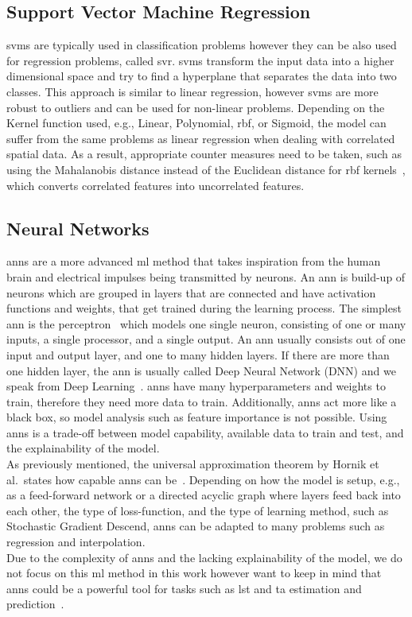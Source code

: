 \subsection{Support Vector Machine Regression}

\gls{svm}s are typically used in classification problems however they can be also used for regression problems, called \gls{svr}. \gls{svm}s transform the input data into a higher dimensional space and try to find a hyperplane that separates the data into two classes. This approach is similar to linear regression, however \gls{svm}s are more robust to outliers and can be used for non-linear problems. Depending on the Kernel function used, e.g., Linear, Polynomial, \gls{rbf}, or Sigmoid, the model can suffer from the same problems as linear regression when dealing with correlated spatial data.
As a result, appropriate counter measures need to be taken, such as using the Mahalanobis distance instead of the Euclidean distance for \gls{rbf} kernels~\cite{kamada2006support}, which converts correlated features into uncorrelated features.

\subsection{Neural Networks}

\gls{ann}s are a more advanced \gls{ml} method that takes inspiration from the human brain and electrical impulses being transmitted by neurons. An \gls{ann} is build-up of neurons which are grouped in layers that are connected and have activation functions and weights, that get trained during the learning process. The simplest \gls{ann} is the perceptron~\cite{rosenblatt1957perceptron} which models one single neuron, consisting of one or many inputs, a single processor, and a single output. An \gls{ann} usually consists out of one input and output layer, and one to many hidden layers. If there are more than one hidden layer, the \gls{ann} is usually called Deep Neural Network (DNN) and we speak from Deep Learning~\cite{lecun2015deep}. \gls{ann}s have many hyperparameters and weights to train, therefore they need more data to train. Additionally, \gls{ann}s act more like a black box, so model analysis such as feature importance is not possible. Using \gls{ann}s is a trade-off between model capability, available data to train and test, and the explainability of the model.\\
As previously mentioned, the universal approximation theorem by Hornik et al.\ states how capable \gls{ann}s can be~\cite{hornik1989multilayer}. Depending on how the model is setup, e.g., as a feed-forward network or a directed acyclic graph where layers feed back into each other, the type of loss-function, and the type of learning method, such as Stochastic Gradient Descend, \gls{ann}s can be adapted to many problems such as regression and interpolation.\\
Due to the complexity of \gls{ann}s and the lacking explainability of the model, we do not focus on this \gls{ml} method in this work however want to keep in mind that \gls{ann}s could be a powerful tool for tasks such as \gls{lst} and \gls{ta} estimation and prediction~\cite{yuan2020deep}.
